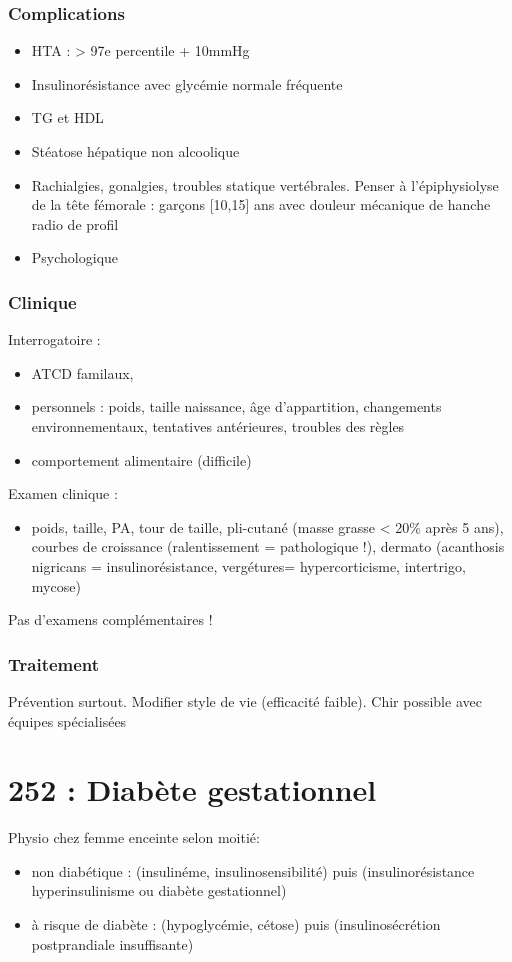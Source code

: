 \documentclass[11pt]{article}
\begin{document}
\subsubsection{Complications}
\label{sec:org1c34922}
\begin{itemize}
\item HTA : > 97e percentile + 10mmHg
\item Insulinorésistance avec glycémie normale fréquente
\item \inc TG et \dec HDL
\item Stéatose hépatique non alcoolique
\item Rachialgies, gonalgies, troubles statique vertébrales. Penser à l'épiphysiolyse
de la tête fémorale : garçons [10,15] ans avec douleur mécanique de hanche
\thus radio de profil
\item Psychologique
\end{itemize}

\subsubsection{Clinique}
\label{sec:orgab34f41}
Interrogatoire : 
\begin{itemize}
\item ATCD familaux,
\item personnels : poids, taille naissance, âge d'appartition, changements environnementaux, tentatives antérieures, troubles des règles
\item comportement alimentaire (difficile)
\end{itemize}
Examen clinique :
\begin{itemize}
\item poids, taille, PA, tour de taille, pli-cutané (masse grasse < 20\% après 5 ans), courbes de
croissance (ralentissement = pathologique !), dermato (acanthosis nigricans =
insulinorésistance, vergétures= hypercorticisme, intertrigo, mycose)
\end{itemize}
Pas d'examens complémentaires !

\subsubsection{Traitement}
\label{sec:orgd83eed5}
Prévention surtout. Modifier style de vie (efficacité faible). Chir possible
avec équipes spécialisées
\section{252 : Diabète gestationnel}
\label{sec:org03d2aa6}
Physio chez femme enceinte selon moitié:
\begin{itemize}
\item non diabétique : (\inc insulinéme, insulinosensibilité) puis (insulinorésistance
\thus hyperinsulinisme ou diabète gestationnel)
\item à risque de diabète : (hypoglycémie, cétose) puis (insulinosécrétion
postprandiale insuffisante)
\end{itemize}
\end{document}
